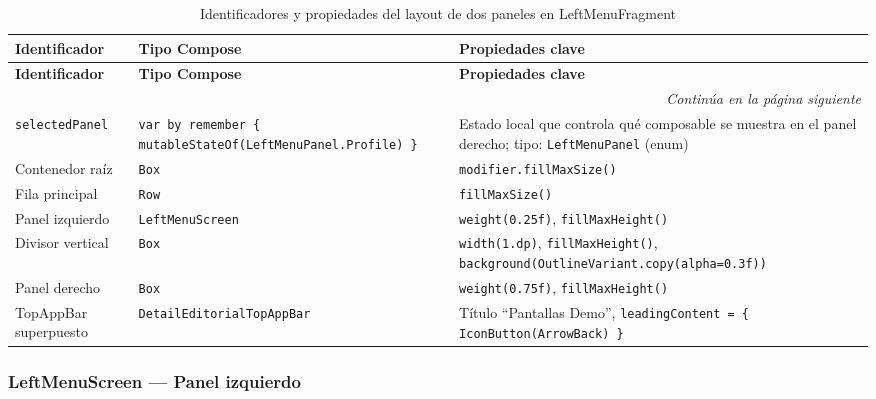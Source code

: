\documentclass[stu, 12pt, letterpaper, donotrepeattitle, floatsintext, natbib]{apa7}
\begin{document}
\begin{longtable}{@{}p{2.5cm}p{5.5cm}p{7.5cm}@{}}
\caption{Identificadores y propiedades del layout de dos paneles en LeftMenuFragment}
\label{tab:idleftmenu}\\
\toprule
\textbf{Identificador} & \textbf{Tipo Compose} & \textbf{Propiedades clave} \\
\midrule
\endfirsthead
\toprule
\textbf{Identificador} & \textbf{Tipo Compose} & \textbf{Propiedades clave} \\
\midrule
\endhead
\midrule
\multicolumn{3}{r}{\small\textit{Continúa en la página siguiente}}\\
\endfoot
\bottomrule
\endlastfoot
\texttt{selectedPanel} & \texttt{var by remember \{ mutableStateOf(LeftMenuPanel.Profile) \}} & Estado local que controla qué composable se muestra en el panel derecho; tipo: \texttt{LeftMenuPanel} (enum) \\[3pt]
Contenedor raíz & \texttt{Box} & \texttt{modifier.fillMaxSize()} \\[3pt]
Fila principal & \texttt{Row} & \texttt{fillMaxSize()} \\[3pt]
Panel izquierdo & \texttt{LeftMenuScreen} & \texttt{weight(0.25f)}, \texttt{fillMaxHeight()} \\[3pt]
Divisor vertical & \texttt{Box} & \texttt{width(1.dp)}, \texttt{fillMaxHeight()}, \texttt{background(OutlineVariant.copy(alpha=0.3f))} \\[3pt]
Panel derecho & \texttt{Box} & \texttt{weight(0.75f)}, \texttt{fillMaxHeight()} \\[3pt]
TopAppBar superpuesto & \texttt{DetailEditorialTopAppBar} & Título ``Pantallas Demo'', \texttt{leadingContent = \{ IconButton(ArrowBack) \}} \\
\end{longtable}

\subsubsection{LeftMenuScreen --- Panel izquierdo}
\end{document}
